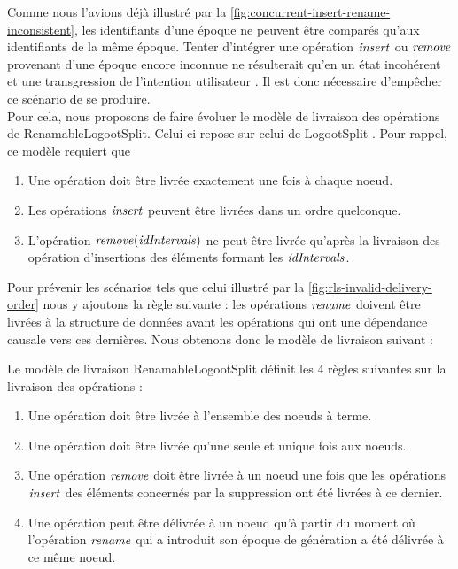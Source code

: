 Comme nous l'avions déjà illustré par la \autoref{fig:concurrent-insert-rename-inconsistent}, les identifiants d'une époque ne peuvent être comparés qu'aux identifiants de la même époque.
Tenter d'intégrer une opération $\mathit{insert}$ ou $\mathit{remove}$ provenant d'une époque encore inconnue ne résulterait qu'en un état incohérent et une transgression de l'intention utilisateur .
Il est donc nécessaire d'empêcher ce scénario de se produire.\\

Pour cela, nous proposons de faire évoluer le modèle de livraison des opérations de RenamableLogootSplit.
Celui-ci repose sur celui de LogootSplit .
Pour rappel, ce modèle requiert que
\begin{enumerate}
  \item Une opération doit être livrée exactement une fois à chaque noeud.
  \item Les opérations $\mathit{insert}$ peuvent être livrées dans un ordre quelconque.
  \item L'opération $\mathit{remove}(\mathit{idIntervals})$ ne peut être livrée qu'après la livraison des opération d'insertions des éléments formant les $\mathit{idIntervals}$.
\end{enumerate}

Pour prévenir les scénarios tels que celui illustré par la \autoref{fig:rls-invalid-delivery-order} nous y ajoutons la règle suivante : les opérations $\mathit{rename}$ doivent être livrées à la structure de données avant les opérations qui ont une dépendance causale vers ces dernières.
Nous obtenons donc le modèle de livraison suivant :

\begin{definition}
  \label{def:rls-delivery-model}
  Le modèle de livraison RenamableLogootSplit définit les 4 règles suivantes sur la livraison des opérations :
  \begin{enumerate}
    \item Une opération doit être livrée à l'ensemble des noeuds à terme.
    \item Une opération doit être livrée qu'une seule et unique fois aux noeuds.
    \item Une opération $\mathit{remove}$ doit être livrée à un noeud une fois que les opérations $\mathit{insert}$ des éléments concernés par la suppression ont été livrées à ce dernier.
    \item Une opération peut être délivrée à un noeud qu'à partir du moment où l'opération $\mathit{rename}$ qui a introduit son époque de génération a été délivrée à ce même noeud.
  \end{enumerate}
\end{definition}

